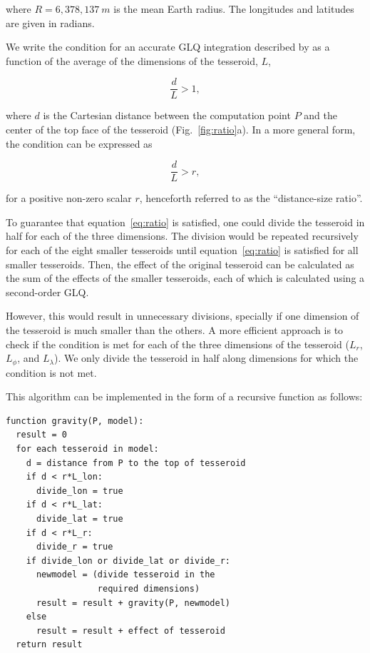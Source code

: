 \noindent
where $R=6,378,137\ m$ is the mean Earth radius.
The longitudes and latitudes are given in radians.

We write the condition for an accurate GLQ integration
described by \citet{Ku1977}
as a function of
the average of the dimensions of the tesseroid, $L$,

\begin{equation}
    \frac{d}{L} > 1,
\end{equation}

\noindent
where $d$ is the Cartesian distance
between the computation point $P$
and the center of the top face of the tesseroid
(Fig.~\ref{fig:ratio}a).
In a more general form, the condition can be expressed as

\begin{equation}
    \frac{d}{L} > r,
    \label{eq:ratio}
\end{equation}

\noindent
for a positive non-zero scalar $r$,
henceforth referred to as
the ``distance-size ratio''.

To guarantee that equation~\ref{eq:ratio} is satisfied,
one could divide the tesseroid in half for each of the three dimensions.
The division would be repeated recursively
for each of the eight smaller tesseroids
until equation~\ref{eq:ratio} is satisfied for all smaller tesseroids.
Then, the effect of the original tesseroid can be calculated
as the sum of the
effects of the smaller tesseroids,
each of which is calculated using a second-order GLQ.

However, this would result in unnecessary divisions,
specially if one dimension of the tesseroid is much smaller than the others.
A more efficient approach is to check if the condition is met for each of the
three dimensions of the tesseroid ($L_r$, $L_\phi$, and $L_\lambda$).
We only divide the tesseroid in half along dimensions for which the condition
is not met.

This algorithm can be implemented
in the form of a recursive function
as follows:

\begin{verbatim}
function gravity(P, model):
  result = 0
  for each tesseroid in model:
    d = distance from P to the top of tesseroid
    if d < r*L_lon:
      divide_lon = true
    if d < r*L_lat:
      divide_lat = true
    if d < r*L_r:
      divide_r = true
    if divide_lon or divide_lat or divide_r:
      newmodel = (divide tesseroid in the
                  required dimensions)
      result = result + gravity(P, newmodel)
    else
      result = result + effect of tesseroid
  return result
\end{verbatim}


